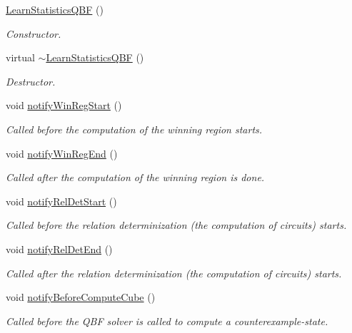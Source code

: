 \begin{DoxyCompactItemize}
\item 
\hyperlink{classLearnStatisticsQBF_a9e98cf8a5d7507e3d2a6026f1369e383}{Learn\-Statistics\-Q\-B\-F} ()
\begin{DoxyCompactList}\small\item\em Constructor. \end{DoxyCompactList}\item 
virtual \hyperlink{classLearnStatisticsQBF_a1827c8e599f8c3f74186fd3a5fa250c4}{$\sim$\-Learn\-Statistics\-Q\-B\-F} ()
\begin{DoxyCompactList}\small\item\em Destructor. \end{DoxyCompactList}\item 
void \hyperlink{classLearnStatisticsQBF_a89cb7bd50255ee97dc040c4a48439dea}{notify\-Win\-Reg\-Start} ()
\begin{DoxyCompactList}\small\item\em Called before the computation of the winning region starts. \end{DoxyCompactList}\item 
void \hyperlink{classLearnStatisticsQBF_afa94736042d6e23e3042517d8db00a50}{notify\-Win\-Reg\-End} ()
\begin{DoxyCompactList}\small\item\em Called after the computation of the winning region is done. \end{DoxyCompactList}\item 
void \hyperlink{classLearnStatisticsQBF_ae88030461fe06f198b596054bf31ce64}{notify\-Rel\-Det\-Start} ()
\begin{DoxyCompactList}\small\item\em Called before the relation determinization (the computation of circuits) starts. \end{DoxyCompactList}\item 
void \hyperlink{classLearnStatisticsQBF_ac00e3d7a0cc77573c2dca94460bbb354}{notify\-Rel\-Det\-End} ()
\begin{DoxyCompactList}\small\item\em Called after the relation determinization (the computation of circuits) starts. \end{DoxyCompactList}\item 
void \hyperlink{classLearnStatisticsQBF_a6aff1d90b24d33dccf27af13f9376ee1}{notify\-Before\-Compute\-Cube} ()
\begin{DoxyCompactList}\small\item\em Called before the Q\-B\-F solver is called to compute a counterexample-\/state. \end{DoxyCompactList}\item 

\end{DoxyCompactItemize}
